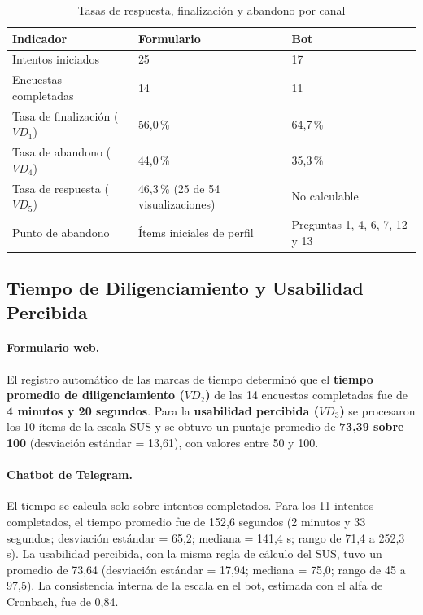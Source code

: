 \documentclass[12pt,letterpaper]{article}
\begin{document}
\begin{table}[htbp]
\centering
\caption{Tasas de respuesta, finalización y abandono por canal}
\label{tab:finalizacion}
\small
\begin{tabular}{|p{5cm}|p{4.2cm}|p{4.2cm}|}
\hline
\textbf{Indicador} & \textbf{Formulario} & \textbf{Bot} \\ \hline
Intentos iniciados & 25 & 17 \\ \hline
Encuestas completadas & 14 & 11 \\ \hline
Tasa de finalización ($VD_1$) & 56,0\,\% & 64,7\,\% \\ \hline
Tasa de abandono ($VD_4$) & 44,0\,\% & 35,3\,\% \\ \hline
Tasa de respuesta ($VD_5$) & 46,3\,\% (25 de 54 visualizaciones) & No calculable \\ \hline
Punto de abandono & Ítems iniciales de perfil & Preguntas 1, 4, 6, 7, 12 y 13 \\ \hline
\end{tabular}
\end{table}

\subsection{Tiempo de Diligenciamiento y Usabilidad Percibida}

\paragraph{Formulario web.} El registro automático de las marcas de tiempo determinó que el \textbf{tiempo promedio de diligenciamiento ($VD_2$)} de las 14 encuestas completadas fue de \textbf{4 minutos y 20 segundos}. Para la \textbf{usabilidad percibida ($VD_3$)} se procesaron los 10 ítems de la escala SUS y se obtuvo un puntaje promedio de \textbf{73,39 sobre 100} (desviación estándar = 13,61), con valores entre 50 y 100.

\paragraph{Chatbot de Telegram.} El tiempo se calcula solo sobre intentos completados. Para los 11 intentos completados, el tiempo promedio fue de 152,6 segundos (2 minutos y 33 segundos; desviación estándar = 65,2; mediana = 141,4 s; rango de 71,4 a 252,3 s). La usabilidad percibida, con la misma regla de cálculo del SUS, tuvo un promedio de 73,64 (desviación estándar = 17,94; mediana = 75,0; rango de 45 a 97,5). La consistencia interna de la escala en el bot, estimada con el alfa de Cronbach, fue de 0,84.
\end{document}
